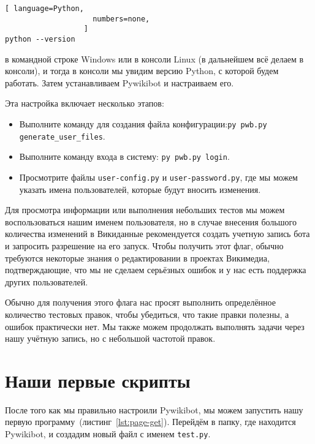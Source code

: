 \begin{lstlisting}[ language=Python,
                    numbers=none,
                  ]
python --version
\end{lstlisting}
в командной строке Windows или в консоли Linux (в дальнейшем всё делаем в консоли), 
и тогда в консоли мы увидим версию Python, с которой будем работать. Затем устанавливаем Pywikibot и настраиваем его. 

Эта настройка включает несколько этапов:
\begin{itemize}
  \setlength{\itemindent}{2em}
  \item Выполните команду для создания файла конфигурации:\newline \lstinline|py pwb.py generate_user_files|.
  \item Выполните команду входа в систему: \lstinline|py pwb.py login|.
  \item Просмотрите файлы \lstinline|user-config.py| и \lstinline|user-password.py|, где мы можем указать имена пользователей, которые будут вносить изменения.
\end{itemize}

Для просмотра информации или выполнения небольших тестов мы можем воспользоваться нашим именем пользователя, но в случае внесения большого количества изменений в Викиданные рекомендуется создать учетную запись бота и запросить разрешение на его запуск. Чтобы получить этот флаг, обычно требуются некоторые знания о редактировании в проектах Викимедиа, подтверждающие, что мы не сделаем серьёзных ошибок и у нас есть поддержка других пользователей.

Обычно для получения этого флага нас просят выполнить определённое количество тестовых правок, чтобы убедиться, что такие правки полезны, а ошибок практически нет. Мы также можем продолжать выполнять задачи через нашу учётную запись, но с небольшой частотой правок.


\section{Наши первые скрипты}

\label{sec:firstScript}
После того как мы правильно настроили Pywikibot, мы можем запустить 
нашу первую программу~(листинг~\ref{lst:page-get}). 
Перейдём в папку, где находится Pywikibot, и создадим новый файл с именем \lstinline|test.py|.

